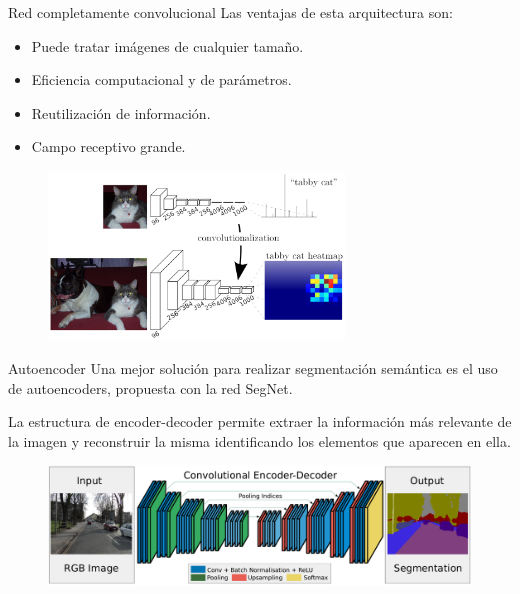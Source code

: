 \begin{frame}{Red completamente convolucional}
Las ventajas de esta arquitectura son:
\begin{itemize}
    \item Puede tratar \alert{imágenes de cualquier tamaño}.
    \item \alert{Eficiencia computacional} y de \alert{parámetros}.
    \item Reutilización de \alert{información}.
    \item Campo receptivo \alert{grande}.
\end{itemize}

\begin{figure}
    \centering
    \includegraphics[width=0.7\textwidth]{figures/Tema 4/FullyCNNPaper.png}
    \caption{\cite{long2015fully}}
\end{figure}
\end{frame}

\begin{frame}{Autoencoder}
Una \alert{mejor solución} para realizar segmentación semántica es el uso de \alert{autoencoders}, propuesta con la red \alert{SegNet}\cite{badrinarayanan2015segnet}.

La estructura de \alert{encoder-decoder} permite extraer la información más relevante de la imagen y \alert{reconstruir} la misma \alert{identificando los elementos} que aparecen en ella.

\begin{figure}
    \centering
    \includegraphics[width=\textwidth]{figures/Tema 4/SegNet.png}
    \caption{\cite{badrinarayanan2015segnet}}
\end{figure}
\end{frame}

